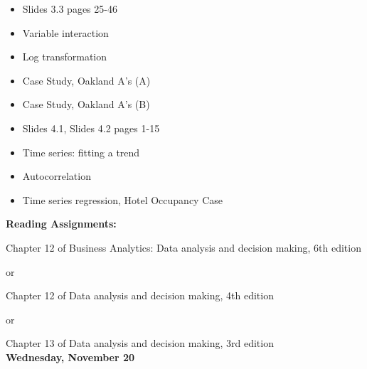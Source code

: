\documentclass[11pt]{article}
\begin{document}
\begin{itemize}
\item Slides 3.3 pages 25-46
\item Variable interaction
\item Log transformation
\item Case Study, Oakland A's (A)
\item Case Study, Oakland A's (B)

\item Slides 4.1, Slides 4.2 pages 1-15
\item Time series: fitting a trend

\item Autocorrelation
\item Time series regression, Hotel Occupancy Case



\end{itemize}

\noindent\textbf{Reading Assignments:}

Chapter 12 of Business Analytics: Data analysis and decision making, 6th edition

or 

Chapter 12 of Data analysis and decision making, 4th edition

or 

Chapter 13 of  Data analysis and decision making, 3rd edition\\




\vspace{5mm}
\noindent\textbf{\large Wednesday, November 20} 
\end{document}
